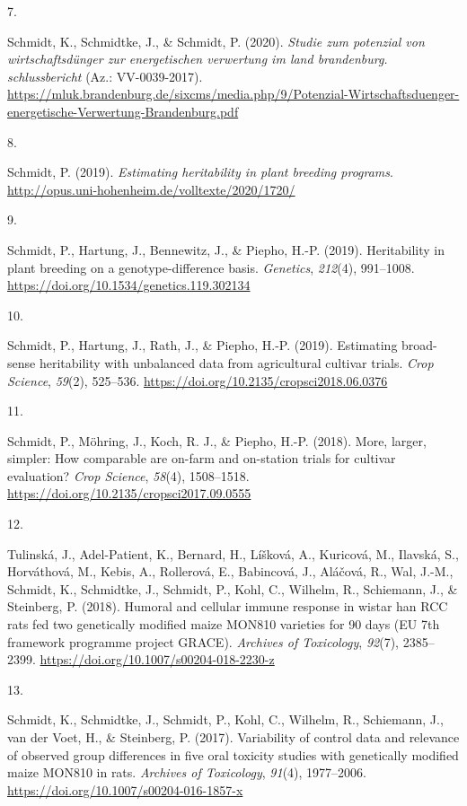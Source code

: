 \documentclass[11pt,a4paper,]{awesome-cv}
\newlength{\cslhangindent}
\newlength{\csllabelwidth}
\newenvironment{CSLReferences}[2] %
 {\begin{list}{}{%
  \setlength{\itemindent}{0pt}
  \setlength{\leftmargin}{0pt}
  \setlength{\parsep}{0pt}
  \ifodd #1
   \setlength{\leftmargin}{\cslhangindent}
   \setlength{\itemindent}{-1\cslhangindent}
  \fi
  \setlength{\itemsep}{#2\baselineskip}}}
 {\end{list}}
\newcommand{\CSLLeftMargin}[1]{\parbox[t]{\csllabelwidth}{\strut#1\strut}}
\newcommand{\CSLRightInline}[1]{\parbox[t]{\linewidth - \csllabelwidth}{\strut#1\strut}}
\begin{document}
\begin{CSLReferences}{0}{0}
\CSLLeftMargin{7. }%
\CSLRightInline{Schmidt, K., Schmidtke, J., \& Schmidt, P. (2020).
\emph{Studie zum potenzial von wirtschaftsdünger zur energetischen
verwertung im land brandenburg. schlussbericht} (Az.: VV-0039-2017).
\url{https://mluk.brandenburg.de/sixcms/media.php/9/Potenzial-Wirtschaftsduenger-energetische-Verwertung-Brandenburg.pdf}}

\CSLLeftMargin{8. }%
\CSLRightInline{Schmidt, P. (2019). \emph{Estimating heritability in
plant breeding programs}.
\url{http://opus.uni-hohenheim.de/volltexte/2020/1720/}}

\CSLLeftMargin{9. }%
\CSLRightInline{Schmidt, P., Hartung, J., Bennewitz, J., \& Piepho,
H.-P. (2019). Heritability in plant breeding on a genotype-difference
basis. \emph{Genetics}, \emph{212}(4), 991--1008.
\url{https://doi.org/10.1534/genetics.119.302134}}

\CSLLeftMargin{10. }%
\CSLRightInline{Schmidt, P., Hartung, J., Rath, J., \& Piepho, H.-P.
(2019). Estimating broad-sense heritability with unbalanced data from
agricultural cultivar trials. \emph{Crop Science}, \emph{59}(2),
525--536. \url{https://doi.org/10.2135/cropsci2018.06.0376}}

\CSLLeftMargin{11. }%
\CSLRightInline{Schmidt, P., Möhring, J., Koch, R. J., \& Piepho, H.-P.
(2018). More, larger, simpler: How comparable are on-farm and on-station
trials for cultivar evaluation? \emph{Crop Science}, \emph{58}(4),
1508--1518. \url{https://doi.org/10.2135/cropsci2017.09.0555}}

\CSLLeftMargin{12. }%
\CSLRightInline{Tulinská, J., Adel-Patient, K., Bernard, H., Líšková,
A., Kuricová, M., Ilavská, S., Horváthová, M., Kebis, A., Rollerová, E.,
Babincová, J., Aláčová, R., Wal, J.-M., Schmidt, K., Schmidtke, J.,
Schmidt, P., Kohl, C., Wilhelm, R., Schiemann, J., \& Steinberg, P.
(2018). Humoral and cellular immune response in wistar han RCC rats fed
two genetically modified maize MON810 varieties for 90 days (EU 7th
framework programme project GRACE). \emph{Archives of Toxicology},
\emph{92}(7), 2385--2399.
\url{https://doi.org/10.1007/s00204-018-2230-z}}

\CSLLeftMargin{13. }%
\CSLRightInline{Schmidt, K., Schmidtke, J., Schmidt, P., Kohl, C.,
Wilhelm, R., Schiemann, J., van der Voet, H., \& Steinberg, P. (2017).
Variability of control data and relevance of observed group differences
in five oral toxicity studies with genetically modified maize MON810 in
rats. \emph{Archives of Toxicology}, \emph{91}(4), 1977--2006.
\url{https://doi.org/10.1007/s00204-016-1857-x}}


\end{CSLReferences}
\end{document}

